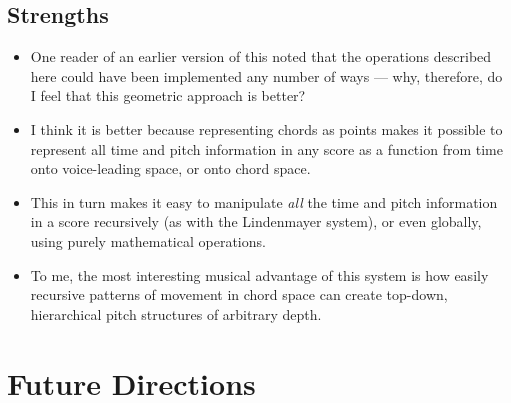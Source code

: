 \documentclass[14pt,letterpaper,onecolumn]{scrartcl}
\begin{document}
\subsection{Strengths}

\begin{itemize}

\item One reader of an earlier version of this noted that the operations described here could have been implemented any number of ways --- why, therefore, do I feel that this geometric approach is better? 

\item I think it is better because representing chords as points makes it possible to represent all time and pitch information in any score as a function from time onto voice-leading space, or onto chord space. 

\item This in turn makes it easy to manipulate \emph{all} the time and pitch information in a score recursively (as with the Lindenmayer system), or even globally, using purely mathematical operations.

\item To me, the most interesting musical advantage of this system is how easily recursive patterns of movement in chord space can create top-down, hierarchical pitch structures of arbitrary depth.

\end{itemize}

\section{Future Directions}
\end{document}
